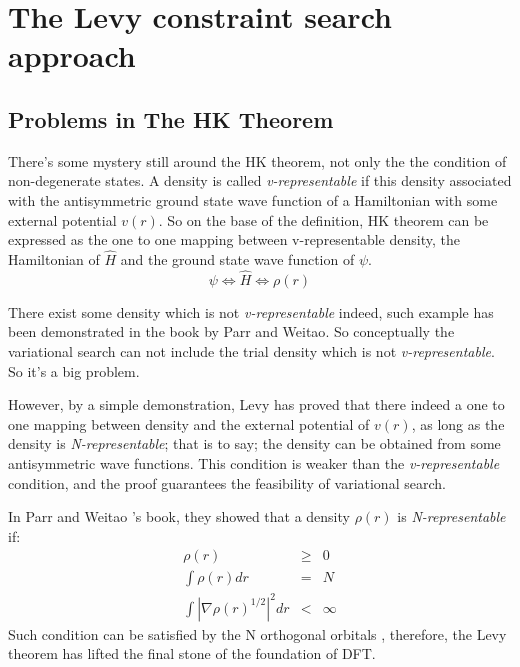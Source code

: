 \section{The Levy constraint search approach}\label{DFTI:1}
%
%
%
%
%
%
\subsection{Problems in The HK Theorem}

There's some mystery still around the HK theorem, not only the the
condition of non-degenerate states. A density is called
\emph{v-representable} if this density associated with the
antisymmetric ground state wave function of a Hamiltonian with some
external potential $v(r)$. So on the base of the definition, HK
theorem can be expressed as the one to one mapping between
v-representable density, the Hamiltonian of $\hat{H}$ and the ground
state wave function of $\psi$.
\begin{equation}\label{DFTIeq:1}
  \psi \Leftrightarrow \hat{H} \Leftrightarrow \rho(r)
\end{equation}


There exist some density which is not \emph{v-representable} indeed,
such example has been demonstrated in the book by Parr and
Weitao\cite{weitaoYang}. So conceptually the variational search can
not include the trial density which is not \emph{v-representable}.  So
it's a big problem.

However, by a simple demonstration, Levy\cite{levy1, levy2} has proved
that there indeed a one to one mapping between density and the
external potential of $v(r)$, as long as the density is
\emph{N-representable}; that is to say; the density can be obtained
from some antisymmetric wave functions. This condition is weaker than
the \emph{v-representable} condition, and the proof guarantees the
feasibility of variational search.

In Parr and Weitao 's book, they showed that a density $\rho(r)$ is
\emph{N-representable} if:
\begin{eqnarray}
  \rho(r) &\geq& 0 \nonumber \\
  \int \rho(r) dr &=&  N \nonumber \\
  \int | \nabla \rho(r)^{1/2} |^{2} dr &<& \infty
\end{eqnarray}
Such condition can be satisfied by the N orthogonal orbitals ,
therefore, the Levy theorem has lifted the final stone of the
foundation of DFT.


